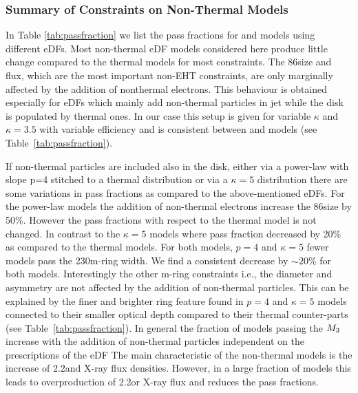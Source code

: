 \subsubsection{Summary of Constraints on Non-Thermal Models}



In Table \ref{tab:passfraction} we list the pass fractions for \bhac and \hamr models using different eDFs.
Most non-thermal eDF models considered here produce little change compared to the thermal models for most constraints.
The 86\GHz size and flux, which are the most important non-EHT constraints, are only marginally affected by the addition of nonthermal electrons.
This behaviour is obtained especially for eDFs which mainly add non-thermal particles in jet while the disk is populated by thermal ones.
In our case this setup is given for variable $\kappa$ and $\kappa=3.5$ with variable efficiency and is consistent between \bhac and \hamr models (see Table~\ref{tab:passfraction}).

If non-thermal particles are included also in the disk, either via a power-law with slope p=4 stitched to a thermal distribution or via a $\kappa=5$ distribution there are some variations in pass fractions as compared to the above-mentioned eDFs.
\newline For the power-law models the addition of non-thermal electrons increase the 86\GHz size by 50\%.
However the pass fractions with respect to the thermal model is not changed.
In contrast to the $\kappa=5$ models where pass fraction decreased by 20\% as compared to the thermal models.
\newline For both models, $p=4$ and $\kappa=5$ fewer models pass the 230\GHz m-ring width.
We find a consistent decrease by $\sim20\%$ for both models.
Interestingly the other m-ring constraints i.e., the diameter and asymmetry are not affected by the addition of non-thermal particles.
This can be explained by the finer and brighter ring feature found in $p=4$ and $\kappa=5$ models connected to their smaller optical depth compared to their thermal counter-parts (see Table~\ref{tab:passfraction}).
\newline In general the fraction of models passing the $M_{3}$ increase with the addition of non-thermal particles independent on the prescriptions of the eDF
\newline The main characteristic of the non-thermal models is the increase of 2.2\um and X-ray flux densities.
However, in a large fraction of models this leads to overproduction of 2.2\um or X-ray flux and reduces the pass fractions.


